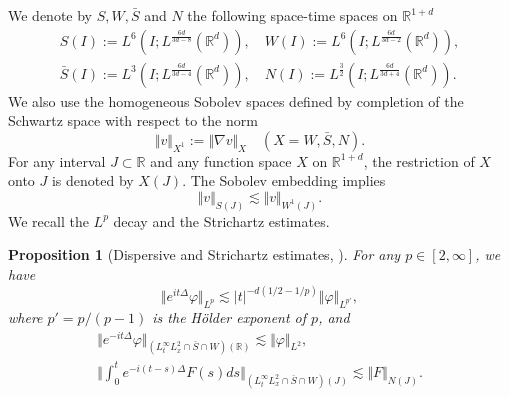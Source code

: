 \documentclass[reqno, 11pt]{amsart}
\numberwithin{equation}{section}
\newcommand{\R}{\mathbb{R}}
\theoremstyle{plain}
\newtheorem{proposition}[theorem]{Proposition}
\theoremstyle{definition}
\numberwithin{equation}{section}
\numberwithin{theorem}{section}
\numberwithin{equation}{section}
\numberwithin{equation}{section}
\numberwithin{theorem}{section}
\begin{document}
	
	
	We denote by $S,W,\bar{S}$ and $N$ the following space-time spaces on $\mathbb{R}^{1+d}$
	\begin{equation*}
	\begin{aligned}
	S(I):=L^{6}\left( I;L^{\frac{6d}{3d-8}} (\mathbb{R}^d)\right), \quad W(I):=L^{6}\left( I;L^{\frac{6d}{3d-2}} (\mathbb{R}^d)\right),\\
	\bar{S}(I):=L^{3}\left( I;L^{\frac{6d}{3d-4}} (\mathbb{R}^d)\right),\quad N(I):=L^{\frac{3}{2}}\left( I;L^{\frac{6d}{3d+4}} (\mathbb{R}^d)\right).
	\end{aligned}
	\end{equation*}
	We also use the homogeneous Sobolev spaces defined by completion of the Schwartz space with respect to the norm
	\begin{equation*}
	\Vert v\Vert_{X^1}:=\Vert \nabla v\Vert_{X}\quad \left( X=W,\bar{S},N\right).
	\end{equation*}
	For any interval $J\subset \mathbb{R}$ and any function space $X$ on $\mathbb{R}^{1+d}$, the restriction of $X$ onto $J$ is denoted by $X(J)$. The Sobolev embedding implies
	\begin{equation*}
	\Vert v\Vert_{S(J)} \lesssim \Vert v\Vert_{W^1(J)}.
	\end{equation*}
	We recall the $L^p$ decay and the Strichartz estimates. 
	\begin{proposition}[Dispersive and Strichartz estimates, \cite{Caz:book}]\label{prop:disp ST est}
		For any $p\in\left[2,\infty\right]$, we have
		\begin{equation*}
		\Vert e^{it\Delta}\varphi\Vert_{L^p} \lesssim |t|^{-d(1/2-1/p)}\Vert \varphi \Vert_{L^{p'}},
		\end{equation*}
		where $p'=p/(p-1)$ is the H\"older exponent of $p$, and 
		\begin{equation}\label{est:St est}
		\begin{aligned}
		\Vert e^{-it\Delta}\varphi\Vert_{\left( L_{t}^{\infty} L_{x}^2 \cap \bar{S} \cap W \right)(\R)} \lesssim \Vert \varphi \Vert_{L^2},\\
		\Vert \int_{0}^{t} e^{-i(t-s)\Delta}F(s)ds \Vert_{\left( L_{t}^{\infty} L_{x}^2 \cap \bar{S} \cap W \right)(J)} \lesssim \Vert F\Vert_{N(J)}.
		\end{aligned}
		\end{equation}
	\end{proposition}
	
\end{document}
